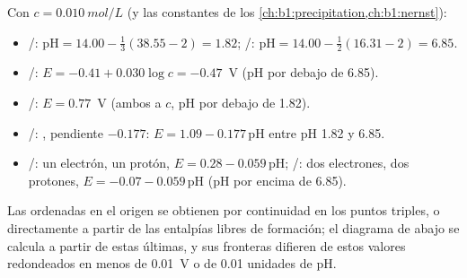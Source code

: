 \begin{example}\label{ex:b1:e-ph-diagrams:iron}
Con $c = \qty{0.010}{mol/L}$ (y las constantes de los \cref{ch:b1:precipitation,ch:b1:nernst}):
\begin{itemize}
  \item {}/: $\mathrm{pH} = 14.00 - \frac13(38.55 - 2) = 1.82$;
        /: $\mathrm{pH} = 14.00 - \frac12(16.31 - 2) = 6.85$.
  \item {}/: $E = -0.41 + 0.030\log c = -0.47$~V (pH por
        debajo de 6.85).
  \item {}/: $E = 0.77$~V (ambos a $c$, pH por debajo de
        1.82).
  \item {}/: ,
        pendiente
        $-0.177$: $E = 1.09 - 0.177\,\mathrm{pH}$ entre pH 1.82 y 6.85.
  \item {}/: un electrón, un protón, $E = 0.28 -
        0.059\,\mathrm{pH}$; /: dos electrones, dos
        protones, $E = -0.07 - 0.059\,\mathrm{pH}$ (pH por encima de
        6.85).
\end{itemize}
Las ordenadas en el origen se obtienen por continuidad en los puntos
triples, o directamente a partir de las entalpías libres de formación; el
diagrama de abajo se calcula a partir de estas últimas, y sus fronteras
difieren de estos valores redondeados en menos de \qty{0.01}{V} o de 0.01
unidades de pH.
\end{example}

